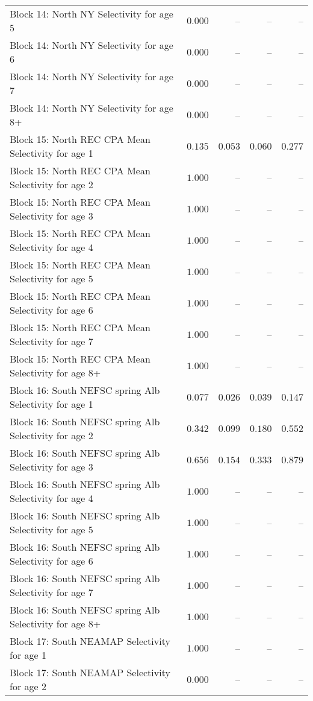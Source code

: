 \documentclass[
]{article}
\begin{document}
\begin{landscape}
\begin{longtable}[t]{lrrrr}
\addlinespace
Block 14: North NY Selectivity for age 5 & $0.000$ & -- & -- & --\\
Block 14: North NY Selectivity for age 6 & $0.000$ & -- & -- & --\\
Block 14: North NY Selectivity for age 7 & $0.000$ & -- & -- & --\\
Block 14: North NY Selectivity for age 8+ & $0.000$ & -- & -- & --\\
Block 15: North REC CPA Mean Selectivity for age 1 & $0.135$ & $0.053$ & $0.060$ & $0.277$\\
\addlinespace
Block 15: North REC CPA Mean Selectivity for age 2 & $1.000$ & -- & -- & --\\
Block 15: North REC CPA Mean Selectivity for age 3 & $1.000$ & -- & -- & --\\
Block 15: North REC CPA Mean Selectivity for age 4 & $1.000$ & -- & -- & --\\
Block 15: North REC CPA Mean Selectivity for age 5 & $1.000$ & -- & -- & --\\
Block 15: North REC CPA Mean Selectivity for age 6 & $1.000$ & -- & -- & --\\
\addlinespace
Block 15: North REC CPA Mean Selectivity for age 7 & $1.000$ & -- & -- & --\\
Block 15: North REC CPA Mean Selectivity for age 8+ & $1.000$ & -- & -- & --\\
Block 16: South NEFSC spring Alb Selectivity for age 1 & $0.077$ & $0.026$ & $0.039$ & $0.147$\\
Block 16: South NEFSC spring Alb Selectivity for age 2 & $0.342$ & $0.099$ & $0.180$ & $0.552$\\
Block 16: South NEFSC spring Alb Selectivity for age 3 & $0.656$ & $0.154$ & $0.333$ & $0.879$\\
\addlinespace
Block 16: South NEFSC spring Alb Selectivity for age 4 & $1.000$ & -- & -- & --\\
Block 16: South NEFSC spring Alb Selectivity for age 5 & $1.000$ & -- & -- & --\\
Block 16: South NEFSC spring Alb Selectivity for age 6 & $1.000$ & -- & -- & --\\
Block 16: South NEFSC spring Alb Selectivity for age 7 & $1.000$ & -- & -- & --\\
Block 16: South NEFSC spring Alb Selectivity for age 8+ & $1.000$ & -- & -- & --\\
\addlinespace
Block 17: South NEAMAP Selectivity for age 1 & $1.000$ & -- & -- & --\\
Block 17: South NEAMAP Selectivity for age 2 & $0.000$ & -- & -- & --\\

\end{longtable}
\end{landscape}
\end{document}
